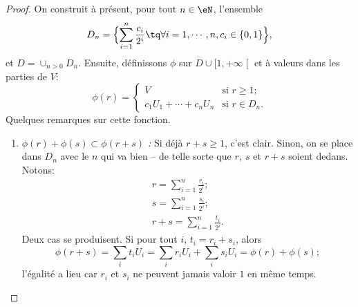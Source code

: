 \begin{proof}
On construit à présent, pour tout \( n \in \eN \), l'ensemble
\begin{equation}
  D_n = \Bigl\{\sum_{i=1}^n \frac {c_i} {2^i} \tq \forall i = 1,\cdots, n, c_i \in \{0,1\}\Bigr\},
\end{equation}
et \( D = \cup_{n>0} D_n\). Ensuite, définissons \(\phi \) sur \(D \cup \mathopen[1,+ \infty\mathclose[ \) et à valeurs dans les parties de \( V \):
\begin{equation}
  \phi (r) =
  \begin{cases}
    V & \text{si } r \geq 1;\\
    c_1 U_1 + \cdots + c_n U_n & \text{si } r \in D_n.
  \end{cases}
\end{equation}
Quelques remarques sur cette fonction.
\begin{enumerate}
  \item \emph{\(\phi(r) + \phi(s) \subset \phi(r+s)\) :} Si déjà \(r + s \geq 1 \), c'est clair. Sinon, on se place dans \( D_n \) avec le \(n \) qui va bien -- de telle sorte que \(r,\ s\) et \(r+s\) soient dedans. Notons:
    \begin{gather}
      r = \sum_{i=1}^n \frac {r_i}{2^i};\\
      s = \sum_{i=1}^n \frac {s_i}{2^i};\\
      r+s = \sum_{i=1}^n \frac {t_i}{2^i}.
    \end{gather}
    Deux cas se produisent. Si pour tout \(i\), \( t_i = r_i + s_i\), alors
    \begin{equation}
      \phi(r+s) = \sum_i t_i U_i = \sum_i r_i U_i + \sum_i s_i U_i = \phi(r) + \phi(s);
    \end{equation}
    l'égalité a lieu car \(r_i\) et \(s_i\) ne peuvent jamais valoir \(1\) en même temps.


\end{enumerate}
\end{proof}
